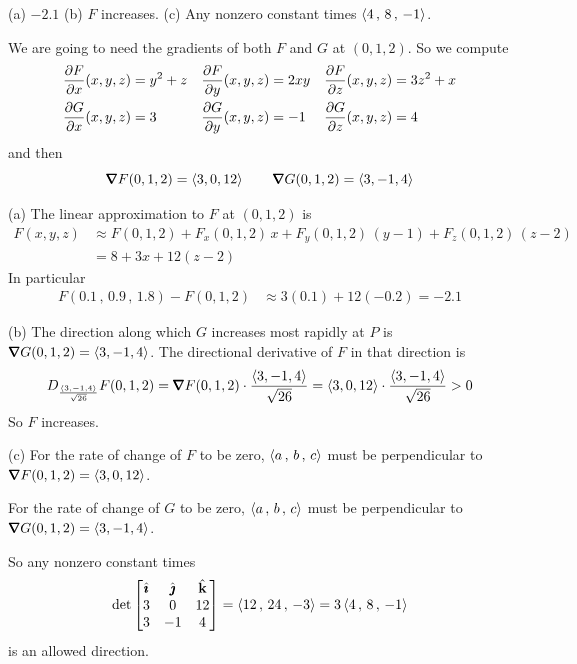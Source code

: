 %

\begin{answer}
(a) $-2.1$\qquad
(b) $F$ increases.\qquad
(c) Any nonzero constant times $\left< 4 \,,\, 8 \,,\, -1 \right>$.
\end{answer}

\begin{solution}
We are going to need the gradients of both $F$ and $G$ at $(0,1,2)$. 
So we compute
\begin{align*}
\pdiff{F}{x}(x,y,z)&=y^2+z &
\pdiff{F}{y}(x,y,z)&=2xy  &
\pdiff{F}{z}(x,y,z)&=3z^2+x \\
\pdiff{G}{x}(x,y,z)&=3 &
\pdiff{G}{y}(x,y,z)&=-1  &
\pdiff{G}{z}(x,y,z)&=4
\end{align*}
and then
\begin{equation*}
\vnabla F(0,1,2) = \llt 3,0,12 \rgt\qquad
\vnabla G(0,1,2) = \llt 3,-1,4 \rgt
\end{equation*}

(a) The linear approximation to $F$ at $(0,1,2)$ is
\begin{align*}
F(x,y,z) 
&\approx F(0,1,2) + F_x(0,1,2)\,x + F_y(0,1,2)\,(y-1) + F_z(0,1,2)\,(z-2) \\
&=8+ 3 x + 12 (z-2)
\end{align*}
In particular
\begin{align*}
F(0.1\,,\,0.9\,,\,1.8) - F(0,1,2)
&\approx 3(0.1) + 12(-0.2)
=-2.1
\end{align*}

(b) The direction along which $G$ increases most rapidly at $P$ is
$\vnabla G(0,1,2) = \llt 3,-1,4 \rgt$. The directional derivative of $F$
in that direction is
\begin{align*}
D_{\frac{\llt 3,-1,4\rgt}{\sqrt{26}}}F(0,1,2) 
 = \vnabla F(0,1,2) \cdot \frac{\llt 3,-1,4\rgt}{\sqrt{26}}
 = \llt 3,0,12 \rgt\cdot \frac{\llt 3,-1,4\rgt}{\sqrt{26}}
 > 0
\end{align*}
So $F$ increases.

(c) 
For the rate of change of $F$ to be zero, 
$\left< a\,,\,b\,,\,c\right>$ must be perpendicular to 
$\vnabla F(0,1,2) = \llt 3,0,12  \rgt$.

For the rate of change of $G$ to be zero, 
$\left< a\,,\,b\,,\,c\right>$ must be perpendicular to 
$\vnabla G(0,1,2) = \llt 3,-1,4 \rgt$.

So any nonzero constant times
\begin{align*}
\det\left[\begin{matrix}
            \hat{\pmb{\imath}}  &  \hat{\pmb{\jmath}}  &  \hat{\mathbf{k}} \\
            3    &   0   &   12 \\
            3    &  -1   &    4 
            \end{matrix}\right]
=\left< 12 \,,\, 24 \,,\, -3 \right>
=3 \left< 4 \,,\, 8 \,,\, -1 \right>
\end{align*}
is an allowed direction.
\end{solution}

